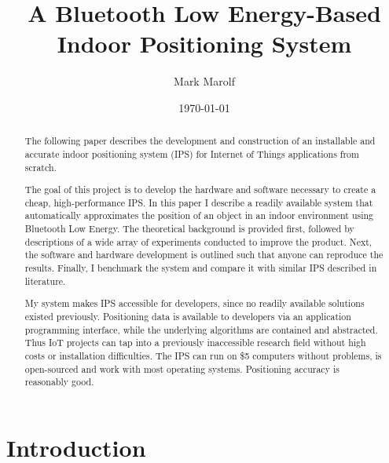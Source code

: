 \documentclass[a4paper, oneside]{ipsreport}
\title{A Bluetooth Low Energy-Based Indoor Positioning System}
\author{Mark Marolf}
\institute{Kantonsschule Baden}
\date{\today}
\begin{document}
\frontmatter

\maketitle

\tableofcontents

\begin{abstract}
	The following paper describes the development and construction of an installable and accurate indoor positioning system (IPS) for Internet of Things applications from scratch.

	The goal of this project is to develop the hardware and software necessary to create a cheap, high-performance IPS. In this paper I describe a readily available system that automatically approximates the position of an object in an indoor environment using Bluetooth Low Energy. The theoretical background is provided first, followed by descriptions of a wide array of experiments conducted to improve the product. Next, the software and hardware development is outlined such that anyone can reproduce the results. Finally, I benchmark the system and compare it with similar IPS described in literature.

	My system makes IPS accessible for developers, since no readily available solutions existed previously. Positioning data is available to developers via an application programming interface, while the underlying algorithms are contained and abstracted. Thus IoT projects can tap into a previously inaccessible research field without high costs or installation difficulties. The IPS can run on \$5 computers without problems, is open-sourced and work with most operating systems. Positioning accuracy is reasonably good.
\end{abstract}

\mainmatter

\chapter{Introduction}
\end{document}
